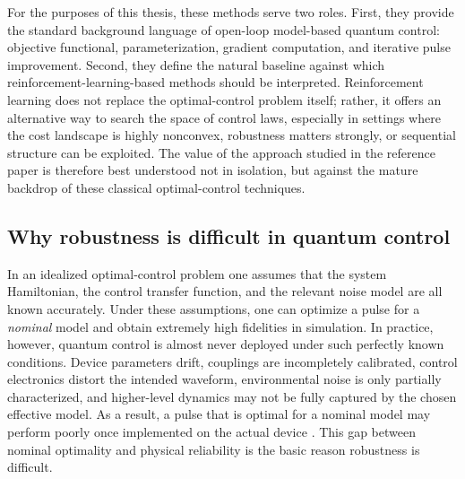 For the purposes of this thesis, these methods serve two roles. First, they provide the standard background language of open-loop model-based quantum control: objective functional, parameterization, gradient computation, and iterative pulse improvement. Second, they define the natural baseline against which reinforcement-learning-based methods should be interpreted. Reinforcement learning does not replace the optimal-control problem itself; rather, it offers an alternative way to search the space of control laws, especially in settings where the cost landscape is highly nonconvex, robustness matters strongly, or sequential structure can be exploited. The value of the approach studied in the reference paper is therefore best understood not in isolation, but against the mature backdrop of these classical optimal-control techniques.



\subsection{Why robustness is difficult in quantum control}
\label{subsec:why_robustness_is_difficult}

In an idealized optimal-control problem one assumes that the system Hamiltonian, the control transfer function, and the relevant noise model are all known accurately. Under these assumptions, one can optimize a pulse for a \emph{nominal} model and obtain extremely high fidelities in simulation. In practice, however, quantum control is almost never deployed under such perfectly known conditions. Device parameters drift, couplings are incompletely calibrated, control electronics distort the intended waveform, environmental noise is only partially characterized, and higher-level dynamics may not be fully captured by the chosen effective model. As a result, a pulse that is optimal for a nominal model may perform poorly once implemented on the actual device \cite{Koch2022,Weidner2025,Propson2022}. This gap between nominal optimality and physical reliability is the basic reason robustness is difficult.

